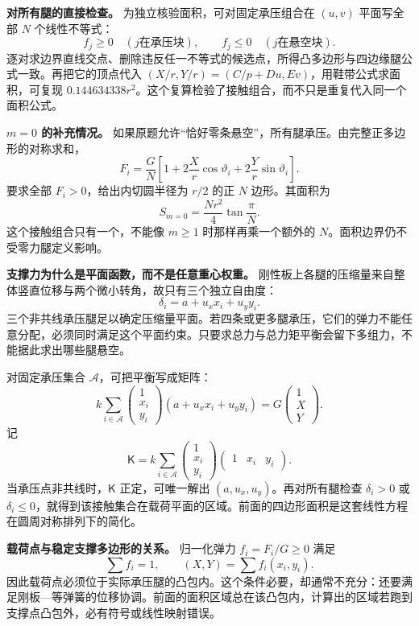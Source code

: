 \documentclass[12pt,a4paper,UTF8]{ctexart}
\begin{document}
\textbf{对所有腿的直接检查。} 为独立核验面积，可对固定承压组合在
\((u,v)\) 平面写全部 \(N\) 个线性不等式： \[
f_j\ge0\quad(j\text{在承压块}),
\qquad
f_j\le0\quad(j\text{在悬空块}).
\]
逐对求边界直线交点、删除违反任一不等式的候选点，所得凸多边形与四边缘腿公式一致。再把它的顶点代入
\((X/r,Y/r)=(C/p+Du,Ev)\)，用鞋带公式求面积，可复现
\(0.144634338r^2\)。这个复算检验了接触组合，而不只是重复代入同一个面积公式。

\textbf{\(m=0\) 的补充情况。}
如果原题允许``恰好零条悬空''，所有腿承压。由完整正多边形的对称求和， \[
F_i=\frac GN\left[1+2\frac Xr\cos\vartheta_i+2\frac Yr\sin\vartheta_i\right].
\] 要求全部 \(F_i>0\)，给出内切圆半径为 \(r/2\) 的正 \(N\)
边形。其面积为 \[
\boxed{S_{m=0}=\frac{Nr^2}{4}\tan\frac\pi N}.
\] 这个接触组合只有一个，不能像 \(m\ge1\) 时那样再乘一个额外的
\(N\)。面积边界仍不受零力腿定义影响。

\textbf{支撑力为什么是平面函数，而不是任意重心权重。}
刚性板上各腿的压缩量来自整体竖直位移与两个微小转角，故只有三个独立自由度：
\[
\delta_i=a+u_xx_i+u_yy_i.
\]
三个非共线承压腿足以确定压缩量平面。若四条或更多腿承压，它们的弹力不能任意分配，必须同时满足这个平面约束。只要求总力与总力矩平衡会留下多组力，不能据此求出哪些腿悬空。

对固定承压集合 \(\mathcal A\)，可把平衡写成矩阵： \[
k\sum_{i\in\mathcal A}
\begin{pmatrix}1\\x_i\\y_i\end{pmatrix}
(a+u_xx_i+u_yy_i)
=G\begin{pmatrix}1\\X\\Y\end{pmatrix}.
\] 记 \[
\mathsf K=k\sum_{i\in\mathcal A}
\begin{pmatrix}1\\x_i\\y_i\end{pmatrix}
\begin{pmatrix}1&x_i&y_i\end{pmatrix}.
\] 当承压点非共线时，\(\mathsf K\) 正定，可唯一解出
\((a,u_x,u_y)\)。再对所有腿检查 \(\delta_i>0\) 或
\(\delta_i\le0\)，就得到该接触集合在载荷平面的区域。前面的四边形面积是这套线性方程在圆周对称排列下的简化。

\textbf{载荷点与稳定支撑多边形的关系。} 归一化弹力 \(f_i=F_i/G\ge0\)
满足 \[
\sum f_i=1,\qquad
(X,Y)=\sum f_i(x_i,y_i).
\]
因此载荷点必须位于实际承压腿的凸包内。这个条件必要，却通常不充分：还要满足刚板---等弹簧的位移协调。前面的面积区域总在该凸包内，计算出的区域若跑到支撑点凸包外，必有符号或线性映射错误。
\end{document}
